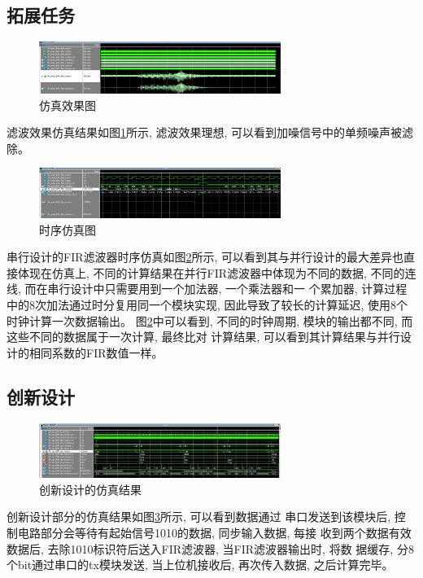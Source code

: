 \documentclass{article}
\begin{document}
\subsection*{拓展任务}
\begin{figure}[htbp]
    \centering
    \includegraphics[width=0.7\textwidth]{image/2024-06-27-02-14-26.png}
    \caption{仿真效果图}
    \label{image_extend_sim_1}
\end{figure}
滤波效果仿真结果如图\ref{image_extend_sim_1}所示, 滤波效果理想, 可以看到加噪信号中的单频噪声被滤除。
\begin{figure}[htbp]
    \centering
    \includegraphics[width=0.7\textwidth]{image/2024-06-27-02-15-54.png}
    \caption{时序仿真图}
    \label{image_extend_sim_2}
\end{figure}

串行设计的FIR滤波器时序仿真如图\ref{image_extend_sim_2}所示, 可以看到其与并行设计的最大差异也直接体现在仿真上, 
不同的计算结果在并行FIR滤波器中体现为不同的数据, 不同的连线, 而在串行设计中只需要用到一个加法器, 一个乘法器和一
个累加器, 计算过程中的8次加法通过时分复用同一个模块实现, 因此导致了较长的计算延迟, 使用8个时钟计算一次数据输出。
图\ref{image_extend_sim_2}中可以看到, 不同的时钟周期, 模块的输出都不同, 而这些不同的数据属于一次计算, 最终比对
计算结果, 可以看到其计算结果与并行设计的相同系数的FIR数值一样。
\subsection*{创新设计}
\begin{figure}[htbp]
    \centering
    \includegraphics[width=0.7\textwidth]{image/2024-06-27-22-24-29.png}
    \caption{创新设计的仿真结果}
    \label{image_innovation_sim_1}
\end{figure}
创新设计部分的仿真结果如图\ref{image_innovation_sim_1}所示, 可以看到数据通过
串口发送到该模块后, 控制电路部分会等待有起始信号1010的数据, 同步输入数据, 每接
收到两个数据有效数据后, 去除1010标识符后送入FIR滤波器, 当FIR滤波器输出时, 将数
据缓存, 分8个bit通过串口的tx模块发送, 当上位机接收后, 再次传入数据, 之后计算完毕。
\end{document}
